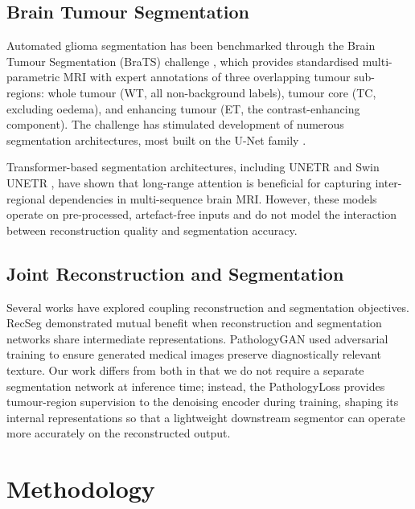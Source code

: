 \documentclass[conference]{IEEEtran}
\begin{document}
\subsection{Brain Tumour Segmentation}

Automated glioma segmentation has been benchmarked through the Brain
Tumour Segmentation (BraTS) challenge \cite{menze2015brats, bakas2017brats,
bakas2018brats}, which provides standardised multi-parametric MRI
with expert annotations of three overlapping tumour sub-regions: whole
tumour (WT, all non-background labels), tumour core (TC, excluding
oedema), and enhancing tumour (ET, the contrast-enhancing component).
The challenge has stimulated development of numerous segmentation
architectures, most built on the U-Net family
\cite{ronneberger2015unet, myronenko2018nnunet}.

Transformer-based segmentation architectures, including UNETR
\cite{hatamizadeh2022unetr} and Swin UNETR \cite{hatamizadeh2021swinunetr},
have shown that long-range attention is beneficial for capturing
inter-regional dependencies in multi-sequence brain MRI. However,
these models operate on pre-processed, artefact-free inputs and
do not model the interaction between reconstruction quality and
segmentation accuracy.

\subsection{Joint Reconstruction and Segmentation}

Several works have explored coupling reconstruction and segmentation
objectives. RecSeg \cite{sun2021recseg} demonstrated mutual benefit
when reconstruction and segmentation networks share intermediate
representations. PathologyGAN \cite{hou2019pathologygan} used
adversarial training to ensure generated medical images preserve
diagnostically relevant texture. Our work differs from both in
that we do not require a separate segmentation network at inference
time; instead, the PathologyLoss provides tumour-region supervision
to the denoising encoder during training, shaping its internal
representations so that a lightweight downstream segmentor can
operate more accurately on the reconstructed output.

\section{Methodology}
\end{document}
